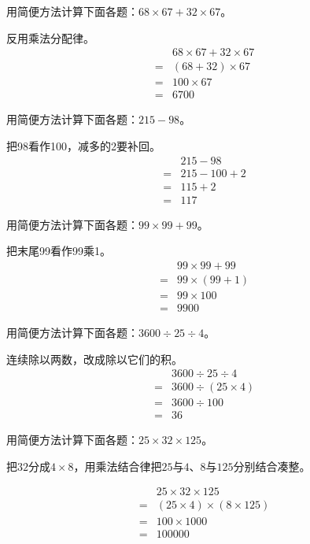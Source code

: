 用简便方法计算下面各题：\(68\times67+32\times67\)。\par
\begin{BookAnswer}
反用乘法分配律。\[\begin{aligned} &68\times67+32\times67\\={}&(68+32)\times67\\={}&100\times67\\={}&6700\end{aligned}\]
\end{BookAnswer}

用简便方法计算下面各题：\(215-98\)。\par
\begin{BookAnswer}
把98看作100，减多的2要补回。\[\begin{aligned} &215-98\\={}&215-100+2\\={}&115+2\\={}&117\end{aligned}\]
\end{BookAnswer}

用简便方法计算下面各题：\(99\times99+99\)。\par
\begin{BookAnswer}
把末尾99看作99乘1。\[\begin{aligned} &99\times99+99\\={}&99\times(99+1)\\={}&99\times100\\={}&9900\end{aligned}\]
\end{BookAnswer}

用简便方法计算下面各题：\(3600\div25\div4\)。\par
\begin{BookAnswer}
连续除以两数，改成除以它们的积。\[\begin{aligned} &3600\div25\div4\\={}&3600\div(25\times4)\\={}&3600\div100\\={}&36\end{aligned}\]
\end{BookAnswer}

用简便方法计算下面各题：\(25\times32\times125\)。\par
\begin{BookAnswer}
把\(32\)分成\(4\times8\)，用乘法结合律把\(25\)与\(4\)、\(8\)与\(125\)分别结合凑整。\par \[\begin{aligned} &25\times32\times125\\={}&(25\times4)\times(8\times125)\\={}&100\times1000\\={}&100000\end{aligned}\]
\end{BookAnswer}

